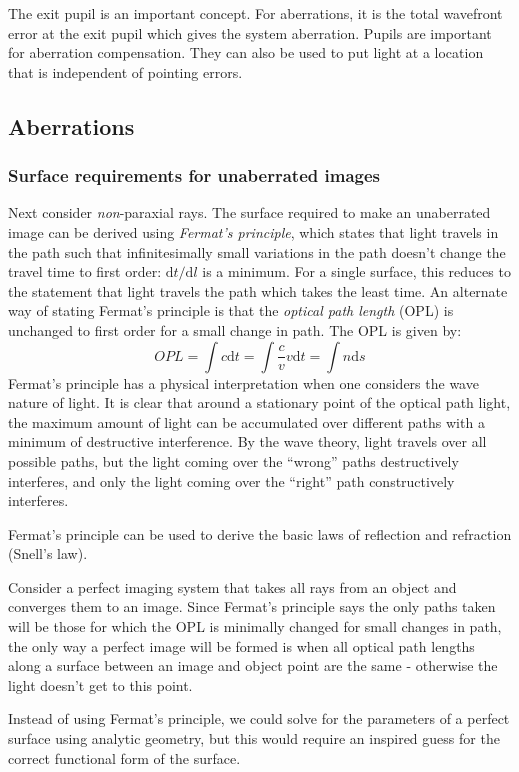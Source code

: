 \documentclass[12pt]{article}
\begin{document}
The exit pupil is an important concept. For aberrations, it is the total
wavefront error at the exit pupil which gives the system aberration. Pupils are
important for aberration compensation. They can also be used to put light at a
location that is independent of pointing errors.

\subsection{Aberrations}\label{ab}
\subsubsection{Surface requirements for unaberrated images}
Next consider \emph{non}-paraxial rays. The surface required to make an
unaberrated image can be derived using \textit{Fermat's principle}, which
states that light travels in the path such that infinitesimally small
variations in the path doesn't change the travel time to first order:
$\mathrm{d}t/\mathrm{d}l$ is a minimum. For a single surface, this reduces to
the statement that light travels the path which takes the least time. An
alternate way of stating Fermat's principle is that the \emph{optical path
length} (OPL) is unchanged to first order for a small change in path. The OPL
is given by:
\[
    OPL
    = \int{c\mathrm{d}t}
    = \int{\frac{c}{v}v\mathrm{d}t}
    = \int{n\mathrm{d}s}
    \]
Fermat's principle has a physical interpretation when one considers the
wave nature of light. It is clear that around a stationary point of the
optical path light, the maximum amount of light can be accumulated over
different paths with a minimum of destructive interference. By the wave
theory, light travels over all possible paths, but the light coming over
the ``wrong'' paths destructively interferes, and only the light coming over
the ``right'' path constructively interferes.

Fermat's principle can be used to derive the basic laws of reflection
and refraction (Snell's law).

Consider a perfect imaging system that takes all rays from an object
and converges them to an image. Since Fermat's principle says
the only paths taken will be those for which the OPL is minimally changed
for small changes in path, the only way a perfect image will be formed is
when all optical path lengths along a surface between an image and object
point are the same - otherwise the light doesn't get to this point.

Instead of using Fermat's principle, we could solve for the parameters
of a perfect surface using analytic geometry, but this would require an
inspired guess for the correct functional form of the surface.
\end{document}

